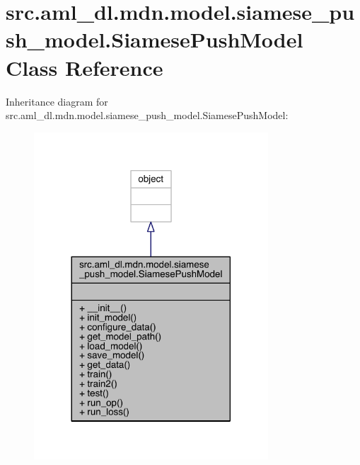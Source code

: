 \hypertarget{classsrc_1_1aml__dl_1_1mdn_1_1model_1_1siamese__push__model_1_1_siamese_push_model}{}\section{src.\+aml\+\_\+dl.\+mdn.\+model.\+siamese\+\_\+push\+\_\+model.\+Siamese\+Push\+Model Class Reference}
\label{classsrc_1_1aml__dl_1_1mdn_1_1model_1_1siamese__push__model_1_1_siamese_push_model}


Inheritance diagram for src.\+aml\+\_\+dl.\+mdn.\+model.\+siamese\+\_\+push\+\_\+model.\+Siamese\+Push\+Model\+:
\nopagebreak
\begin{figure}[H]
\begin{center}
\leavevmode
\includegraphics[width=248pt]{classsrc_1_1aml__dl_1_1mdn_1_1model_1_1siamese__push__model_1_1_siamese_push_model__inherit__graph}
\end{center}
\end{figure}


